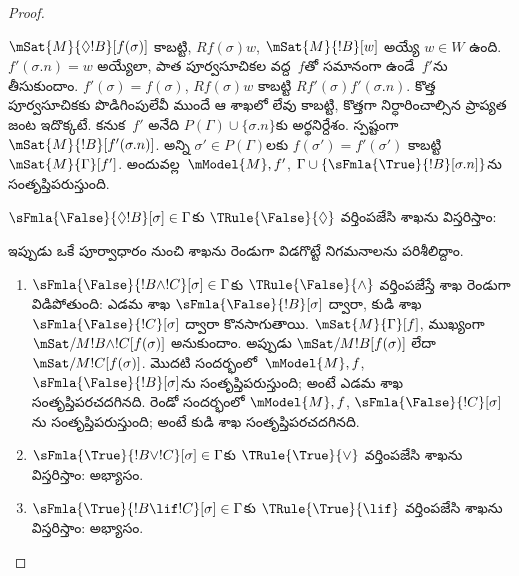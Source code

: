 \documentclass[../../../include/open-logic-section]{subfiles}
\begin{document}
\begin{proof}
\begin{enumerate}
{{  $\mSat{M}{\Diamond !B}[f(\sigma)]$ కాబట్టి, $Rf(\sigma)w$,
  $\mSat{M}{!B}[w]$ అయ్యే $w \in W$ ఉంది. $f'(\sigma.n) = w$
  అయ్యేలా, పాత పూర్వసూచికల వద్ద~$f$తో సమానంగా ఉండే~$f'$ను తీసుకుందాం.
  $f'(\sigma) = f(\sigma)$, $Rf(\sigma)w$ కాబట్టి
  $Rf'(\sigma)f'(\sigma.n)$. కొత్త పూర్వసూచికకు
  పొడిగింపులేవీ ముందే ఆ శాఖలో లేవు కాబట్టి, కొత్తగా
  నిర్ధారించాల్సిన ప్రాప్యత జంట ఇదొక్కటే. కనుక~$f'$
  అనేది $P(\Gamma) \cup \{\sigma.n\}$కు అర్థనిర్దేశం. స్పష్టంగా
  $\mSat{M}{!B}[f'(\sigma.n)]$. అన్ని
  $\sigma' \in P(\Gamma)$లకు $f(\sigma') = f'(\sigma')$ కాబట్టి
  $\mSat{M}{\Gamma}[f']$. అందువల్ల~$\mModel{M}, f'$,
  $\Gamma \cup \{\sFmla{\True}{!B}[\sigma.n]\}$ను
  సంతృప్తిపరుస్తుంది.}
\item $\sFmla{\False}{\Diamond !B}[\sigma] \in \Gamma$కు
  $\TRule{\False}{\Diamond}$ వర్తింపజేసి శాఖను విస్తరిస్తాం:
  }{}
\end{enumerate}
ఇప్పుడు ఒకే పూర్వాధారం నుంచి శాఖను రెండుగా విడగొట్టే నిగమనాలను పరిశీలిద్దాం.
\begin{enumerate}
\item $\sFmla{\False}{!B \land !C}[\sigma] \in \Gamma$కు
  $\TRule{\False}{\land}$ వర్తింపజేస్తే శాఖ రెండుగా విడిపోతుంది:
  ఎడమ శాఖ $\sFmla{\False}{!B}[\sigma]$ ద్వారా, కుడి శాఖ
  $\sFmla{\False}{!C}[\sigma]$ ద్వారా కొనసాగుతాయి.
  $\mSat{M}{\Gamma}[f]$, ముఖ్యంగా
  $\mSat/{M}{!B \land !C}[f(\sigma)]$ అనుకుందాం. అప్పుడు
  $\mSat/{M}{!B}[f(\sigma)]$ లేదా $\mSat/{M}{!C}[f(\sigma)]$.
  మొదటి సందర్భంలో~$\mModel{M}, f$,
  $\sFmla{\False}{!B}[\sigma]$ను సంతృప్తిపరుస్తుంది;
  అంటే ఎడమ శాఖ సంతృప్తిపరచదగినది. రెండో సందర్భంలో
  $\mModel{M}, f$, $\sFmla{\False}{!C}[\sigma]$ను
  సంతృప్తిపరుస్తుంది; అంటే కుడి శాఖ సంతృప్తిపరచదగినది.
\item $\sFmla{\True}{!B \lor !C}[\sigma] \in \Gamma$కు
  $\TRule{\True}{\lor}$ వర్తింపజేసి శాఖను విస్తరిస్తాం:
  అభ్యాసం.
\item $\sFmla{\True}{!B \lif !C}[\sigma] \in \Gamma$కు
  $\TRule{\True}{\lif}$ వర్తింపజేసి శాఖను విస్తరిస్తాం:
  అభ్యాసం.
\end{enumerate}
\end{proof}
\end{document}
